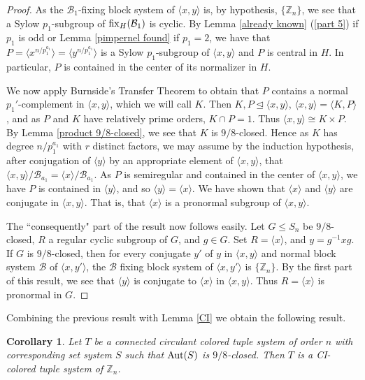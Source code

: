 \documentclass{amsart}
\newtheorem{cor}[thrm]{Corollary}
\theoremstyle{definition}
\theoremstyle{remark}
\numberwithin{equation}{section}
\def\Z{{\mathbb Z}}
\def\la{{\langle}}
\def\ra{{\rangle}}
\def\tl{{\unlhd}}
\def\fix{{\rm fix}}
\def\Aut{{\rm Aut}}
\def\cal{\mathcal}
\begin{document}
\begin{proof}
As the ${\cal B}_1$-fixing block system of $\la x,y\ra$ is, by hypothesis, $\{\Z_n\}$, we see that a Sylow $p_1$-subgroup of $\fix_H({\cal B}_1)$ is cyclic.  By Lemma \ref{already known} (\ref{part 5}) if $p_1$ is odd or Lemma \ref{pimpernel found} if $p_1 = 2$, we have that $P = \la x^{n/p_1^{a_1}}\ra = \la y^{n/p_1^{a_1}}\ra$ is a Sylow $p_1$-subgroup of $\la x,y\ra$ and $P$ is central in $H$.  In particular, $P$ is contained in the center of its normalizer in $H$.

We now apply Burnside's Transfer Theorem \cite[Theorem 8.2.10]{Book} to obtain that $P$ contains a normal $p_1'$-complement in $\la x,y\ra$, which we will call $K$.  Then $K,P\tl \la x,y\ra$, $\la x,y\ra = \la K,P\ra$, and as $P$ and $K$ have relatively prime orders, $K\cap P = 1$.  Thus $\la x,y\ra\cong K\times P$.  By Lemma \ref{product 9/8-closed}, we see that $K$ is $9/8$-closed.  Hence as $K$ has degree $n/p_1^{a_1}$ with $r$ distinct factors, we may assume by the induction hypothesis, after conjugation of $\la y\ra$ by an appropriate element of $\la x,y\ra$, that $\la x,y\ra/{\cal B}_{a_1} = \la x\ra/{\cal B}_{a_1}$.  As $P$ is semiregular and contained in the center of $\la x,y\ra$, we have $P$ is contained in $\la y\ra$, and so $\la y\ra = \la x\ra$.  We have shown that $\la x\ra$ and $\la y\ra$ are conjugate in $\la x,y\ra$.  That is, that $\la x\ra$ is a pronormal subgroup of $\la x,y\ra$.

The ``consequently" part of the result now follows easily.  Let $G\le S_n$ be $9/8$-closed, $R$ a regular cyclic subgroup of $G$, and $g\in G$.  Set $R = \la x\ra$, and $y = g^{-1}xg$.  If $G$ is $9/8$-closed, then for every conjugate $y'$ of $y$ in $\la x,y\ra$ and normal block system ${\cal B}$ of $\la x,y'\ra$, the ${\cal B}$ fixing block system of $\la x,y'\ra$ is $\{\Z_n\}$.  By the first part of this result, we see that $\la y\ra$ is conjugate to $\la x\ra$ in $\la x,y\ra$.  Thus $R = \la x\ra$ is pronormal in $G$.
\end{proof}

Combining the previous result with Lemma \ref{CI} we obtain the following result.

\begin{cor}\label{set system CI}
Let $T$ be a connected circulant colored tuple system of order $n$ with corresponding set system $S$ such that $\Aut(S)$ is $9/8$-closed.  Then $T$ is a CI-colored tuple system of $\Z_n$.
\end{cor}
\end{document}
